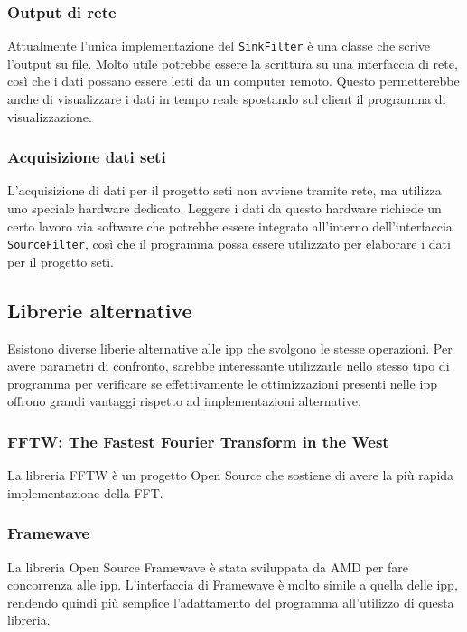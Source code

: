\subsubsection{Output di rete}
Attualmente l'unica implementazione del \texttt{SinkFilter} \`e una classe che
scrive l'output su file. Molto utile potrebbe essere la scrittura su una
interfaccia di rete, cos\`i che i dati possano essere letti da un computer
remoto. Questo permetterebbe anche di visualizzare i dati in tempo reale
spostando sul client il programma di visualizzazione.

\subsubsection{Acquisizione dati \ac{seti}}
\label{seti}
L'acquisizione di dati per il progetto \ac{seti} non avviene tramite rete, ma
utilizza uno speciale hardware dedicato. Leggere i dati da questo hardware
richiede un certo lavoro via software che potrebbe essere integrato all'interno
dell'interfaccia \texttt{SourceFilter}, cos\`i che il programma possa essere
utilizzato per elaborare i dati per il progetto \ac{seti}.

\subsection{Librerie alternative}
\label{altlib}

Esistono diverse liberie alternative alle \ac{ipp} che svolgono le stesse
operazioni. Per avere parametri di confronto, sarebbe interessante utilizzarle
nello stesso tipo di programma per verificare se effettivamente le
ottimizzazioni presenti nelle \ac{ipp} offrono grandi vantaggi rispetto ad
implementazioni alternative.

\subsubsection{FFTW: The Fastest Fourier Transform in the West}
La libreria FFTW \`e un progetto Open Source che sostiene di avere la pi\`u
rapida implementazione della \ac{FFT}.

\subsubsection{Framewave}
La libreria Open Source Framewave \`e stata sviluppata da AMD per fare
concorrenza alle \ac{ipp}. L'interfaccia di Framewave \`e molto simile a quella
delle \ac{ipp}, rendendo quindi pi\`u semplice l'adattamento del programma
all'utilizzo di questa libreria.

